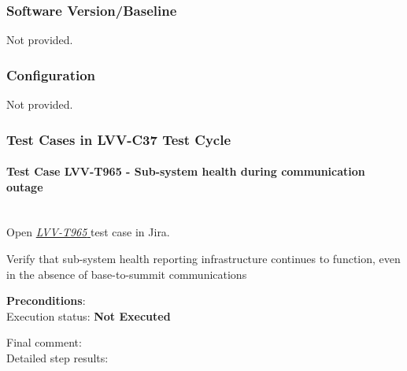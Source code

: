 \documentclass[DM,lsstdraft,STR,toc]{lsstdoc}
\begin{document}
  \subsubsection{Software Version/Baseline}
    Not provided.

  \subsubsection{Configuration}
    Not provided.

  \subsubsection{Test Cases in LVV-C37 Test Cycle}


    \paragraph{Test Case LVV-T965 - Sub-system health during communication outage
 }\mbox{}\\

Open  \href{https://jira.lsstcorp.org/secure/Tests.jspa#/testCase/LVV-T965}{\textit{ LVV-T965 } }
test case in Jira.

    Verify that sub-system health reporting infrastructure continues to
function, even in the absence of base-to-summit communications


    \textbf{ Preconditions}:\\
    

    Execution status: {\bf Not Executed }

    Final comment:\\


    Detailed step results:
\end{document}

